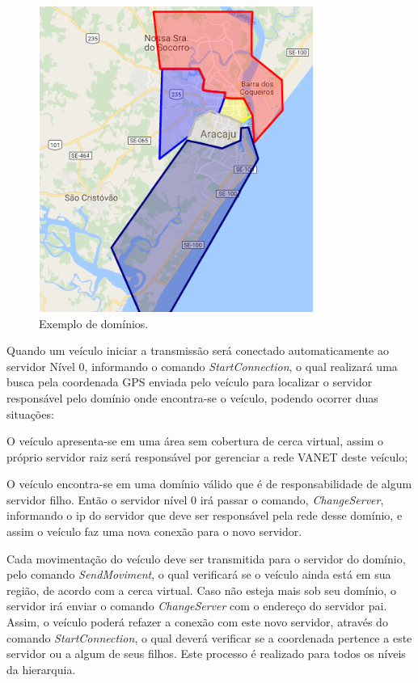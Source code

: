 \documentclass[
	12pt,				%
	oneside,			%
	a4paper,			%
	english,			%
	brazil				%
	]{abntex2ppgsi}
\begin{document}
\begin{figure}[h!]
	\centering
	\includegraphics [width=9cm,height=10cm] {images/dominios.png}
	\caption{Exemplo de domínios.}
	\label{fig:dDominios}
\end{figure}


Quando um veículo iniciar a transmissão será conectado automaticamente ao servidor Nível 0, informando o comando \textit{StartConnection}, o qual realizará uma busca pela coordenada GPS enviada pelo veículo para localizar o servidor responsável pelo domínio onde encontra-se o veículo, podendo ocorrer duas situações:
\begin{enumerate*}
	\item{O veículo apresenta-se em uma área sem cobertura de cerca virtual, assim  o próprio servidor raiz será responsável por gerenciar a rede VANET deste veículo;}
	\item{O veículo encontra-se em uma domínio válido que é de responsabilidade de algum servidor filho. Então o servidor nível 0 irá passar o comando,  \textit{ChangeServer},  informando o ip do servidor que deve ser responsável pela rede desse domínio,  e assim o veículo faz uma nova conexão para o novo servidor.}
\end{enumerate*}
 

Cada movimentação do veículo deve ser transmitida para o servidor do domínio, pelo comando \textit{SendMoviment}, o qual verificará se o veículo ainda está em sua região, de acordo com a cerca virtual. Caso não esteja mais sob seu domínio, o servidor irá enviar o comando \textit{ChangeServer} com o endereço do servidor pai. Assim, o veículo poderá refazer a conexão com este novo servidor, através do comando \textit{StartConnection}, o qual deverá verificar se a coordenada pertence a este servidor ou a algum de seus filhos. Este processo é realizado para todos os níveis da hierarquia.
\end{document}
